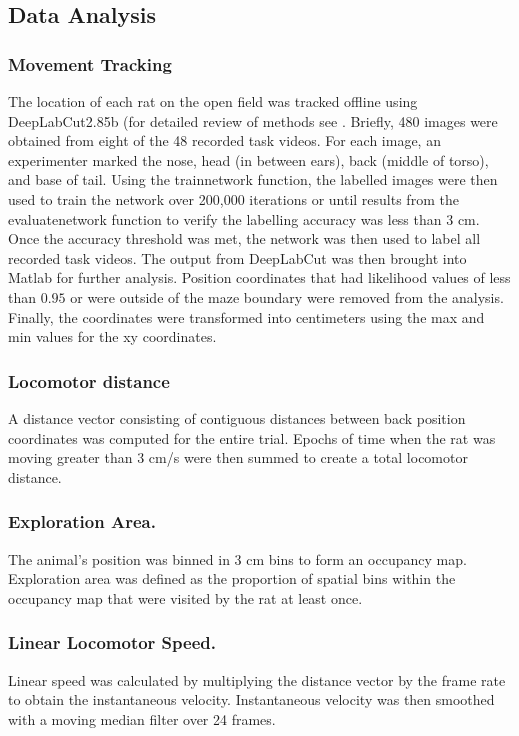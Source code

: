 \documentclass[fleqn,10pt]{wlscirep}
\begin{document}
\subsection*{Data Analysis}
\subsubsection*{Movement Tracking}The location of each rat on the open field was tracked offline using DeepLabCut2.85b (for detailed review of methods see \cite{mathis_deeplabcut_2018}. Briefly, 480 images were obtained from eight of the 48 recorded task videos. For each image, an experimenter marked the nose, head (in between ears), back (middle of torso), and base of tail. Using the trainnetwork function, the labelled images were then used to train the network over 200,000 iterations or until results from the evaluatenetwork function to verify the labelling accuracy was less than 3 cm. Once the accuracy threshold was met, the network was then used to label all recorded task videos. The output from DeepLabCut was then brought into Matlab for further analysis. Position coordinates that had likelihood values of less than $0.95$ or were outside of the maze boundary were removed from the analysis. Finally, the coordinates were transformed into centimeters using the max and min values for the xy coordinates.

\subsubsection*{Locomotor distance} A distance vector consisting of contiguous distances between back position coordinates was computed for the entire trial. Epochs of time when the rat was moving greater than 3 cm/s were then summed to create a total locomotor distance.  

\subsubsection*{Exploration Area.} The animal's position was binned in 3 cm bins to form an occupancy map. Exploration area was defined as the proportion of spatial bins within the occupancy map that were visited by the rat at least once. 

\subsubsection*{Linear Locomotor Speed.} Linear speed was calculated by multiplying the distance vector by the frame rate to obtain the instantaneous velocity. Instantaneous velocity was then smoothed with a moving median filter over 24 frames. 
\end{document}
